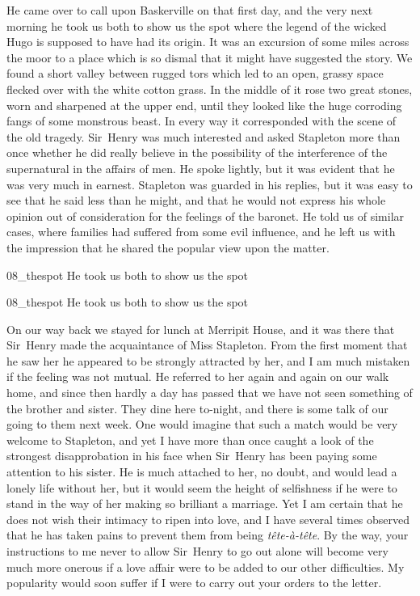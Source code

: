 He came over to call upon Baskerville on that first day, and the very next morning he took us both to show us the spot where the legend of the wicked Hugo is supposed to have had its origin. It was an excursion of some miles across the moor to a place which is so dismal that it might have suggested the story. We found a short valley between rugged tors which led to an open, grassy space flecked over with the white cotton grass. In the middle of it rose two great stones, worn and sharpened at the upper end, until they looked like the huge corroding fangs of some monstrous beast. In every way it corresponded with the scene of the old tragedy. Sir~Henry was much interested and asked Stapleton more than once whether he did really believe in the possibility of the interference of the supernatural in the affairs of men. He spoke lightly, but it was evident that he was very much in earnest. Stapleton was guarded in his replies, but it was easy to see that he said less than he might, and that he would not express his whole opinion out of consideration for the feelings of the baronet. He told us of similar cases, where families had suffered from some evil influence, and he left us with the impression that he shared the popular view upon the matter.



\begin{letter}
	\begin{bwbigpic}
			[1.0]  
		{08_thespot}
		{He took us both to show us the spot}
		\end{bwbigpic}
\end{letter}
\begin{a4}
	\begin{bwbigpic}
		[1.0] 
		{08_thespot}
		{He took us both to show us the spot}
	\end{bwbigpic}
\end{a4}

On our way back we stayed for lunch at Merripit House, and it was there that Sir~Henry made the acquaintance of Miss Stapleton. From the first moment that he saw her he appeared to be strongly attracted by her, and I am much mistaken if the feeling was not mutual. He referred to her again and again on our walk home, and since then hardly a day has passed that we have not seen something of the brother and sister. They dine here to-night, and there is some talk of our going to them next week. One would imagine that such a match would be very welcome to Stapleton, and yet I have more than once caught a look of the strongest disapprobation in his face when Sir~Henry has been paying some attention to his sister. He is much attached to her, no doubt, and would lead a lonely life without her, but it would seem the height of selfishness if he were to stand in the way of her making so brilliant a marriage. Yet I am certain that he does not wish their intimacy to ripen into love, and I have several times observed that he has taken pains to prevent them from being \textit{tête-à-tête}. By the way, your instructions to me never to allow Sir~Henry to go out alone will become very much more onerous if a love affair were to be added to our other difficulties. My popularity would soon suffer if I were to carry out your orders to the letter.



